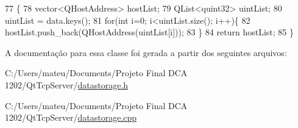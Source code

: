 \begin{DoxyCode}
77 \{
78   vector<QHostAddress> hostList;
79   QList<quint32> uintList;
80   uintList = data.keys();
81   \textcolor{keywordflow}{for}(\textcolor{keywordtype}{int} i=0; i<uintList.size(); i++)\{
82     hostList.push\_back(QHostAddress(uintList[i]));
83   \}
84   \textcolor{keywordflow}{return} hostList;
85 \}
\end{DoxyCode}


A documentação para essa classe foi gerada a partir dos seguintes arquivos\+:\begin{DoxyCompactItemize}
\item 
C\+:/\+Users/mateu/\+Documents/\+Projeto Final D\+C\+A 1202/\+Qt\+Tcp\+Server/\mbox{\hyperlink{datastorage_8h}{datastorage.\+h}}\item 
C\+:/\+Users/mateu/\+Documents/\+Projeto Final D\+C\+A 1202/\+Qt\+Tcp\+Server/\mbox{\hyperlink{datastorage_8cpp}{datastorage.\+cpp}}\end{DoxyCompactItemize}
